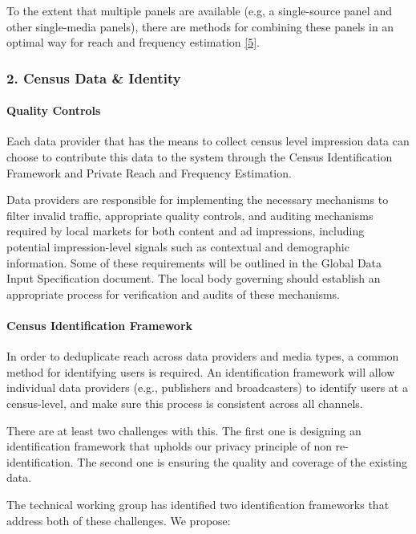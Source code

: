 \documentclass[]{article}
\let\oldparagraph\paragraph
\renewcommand{\paragraph}[1]{\oldparagraph{#1}\mbox{}}
\begin{document}
To the extent that multiple panels are available (e.g, a single-source panel and other single-media panels), there are methods for combining these panels in an optimal way for reach and frequency estimation \hyperref[ref:5]{[5]}.

\subsubsection{2. Census Data \& Identity}

\paragraph{Quality Controls}

Each data provider that has the means to collect census level impression data can choose to contribute this data to the system through the Census Identification Framework and Private Reach and Frequency Estimation.

Data providers are responsible for implementing the necessary mechanisms to filter invalid traffic, appropriate quality controls, and auditing mechanisms required by local markets for both content and ad
impressions, including potential impression-level signals such as contextual and demographic information. Some of these requirements will be outlined in the Global Data Input Specification document. The local
body governing should establish an appropriate process for verification and audits of these mechanisms.

\paragraph{Census Identification Framework}

In order to deduplicate reach across data providers and media types, a common method for identifying users is required. An identification framework will allow individual data providers (e.g., publishers and broadcasters) to identify users at a census-level, and make sure this process is consistent across all channels.

There are at least two challenges with this. The first one is designing an identification framework that upholds our privacy principle of non re-identification. The second one is ensuring the quality and coverage
of the existing data.

The technical working group has identified two identification frameworks that address both of these challenges. We propose:
\end{document}
